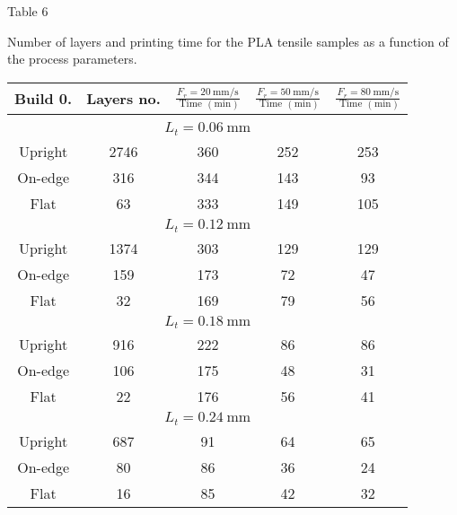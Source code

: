 \documentclass[10pt]{article}
\begin{document}
Table 6

Number of layers and printing time for the PLA tensile samples as a function of the process parameters.

\begin{center}
\begin{tabular}{|c|c|c|c|c|}
\hline
\multirow[b]{2}{*}{Build 0.} & \multirow[b]{2}{*}{Layers no.} & \multirow{2}{*}{$\frac{F_{r}=20 \mathrm{~mm} / \mathrm{s}}{\text { Time }(\mathrm{min})}$} & \multirow{2}{*}{$\frac{F_{r}=50 \mathrm{~mm} / \mathrm{s}}{\text { Time }(\mathrm{min})}$} & \multirow{2}{*}{$\frac{F_{r}=80 \mathrm{~mm} / \mathrm{s}}{\text { Time }(\mathrm{min})}$} \\
\hline
 &  &  &  &  \\
\hline
\multicolumn{5}{|c|}{$L_{t}=0.06 \mathrm{~mm}$} \\
\hline
Upright & 2746 & 360 & 252 & 253 \\
\hline
On-edge & 316 & 344 & 143 & 93 \\
\hline
Flat & 63 & 333 & 149 & 105 \\
\hline
\multicolumn{5}{|c|}{$L_{t}=0.12 \mathrm{~mm}$} \\
\hline
Upright & 1374 & 303 & 129 & 129 \\
\hline
On-edge & 159 & 173 & 72 & 47 \\
\hline
Flat & 32 & 169 & 79 & 56 \\
\hline
\multicolumn{5}{|c|}{$L_{t}=0.18 \mathrm{~mm}$} \\
\hline
Upright & 916 & 222 & 86 & 86 \\
\hline
On-edge & 106 & 175 & 48 & 31 \\
\hline
Flat & 22 & 176 & 56 & 41 \\
\hline
\multicolumn{5}{|c|}{$L_{t}=0.24 \mathrm{~mm}$} \\
\hline
Upright & 687 & 91 & 64 & 65 \\
\hline
On-edge & 80 & 86 & 36 & 24 \\
\hline
Flat & 16 & 85 & 42 & 32 \\
\hline
\end{tabular}
\end{center}
\end{document}
